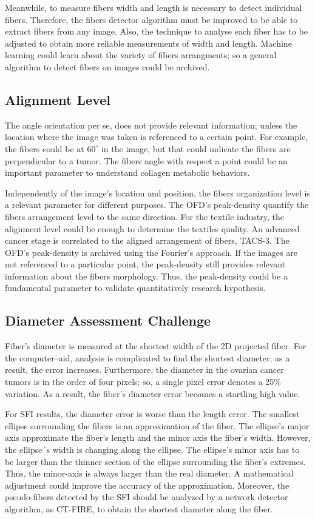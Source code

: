 \documentclass[12pt,a4paper]{article}
\begin{document}
Meanwhile, to measure fibers width and length is necessary to detect individual fibers. Therefore, the fibers detector algorithm must be improved to be able to extract fibers from any image. Also, the technique to analyse each fiber has to be adjusted to obtain more reliable measurements of width and length. Machine learning could learn about the variety of fibers arrangments; so a general algorithm to detect fibers on images could be archived.

\subsection{Alignment Level}
The angle orientation per se, does not provide relevant information; unless the location where the image was taken is referenced to a certain point. For example, the fibers could be at $60^{\circ}$ in the image, but that could indicate the fibers are perpendicular to a tumor. The fibers angle with respect a point could be an important parameter to understand collagen metabolic behaviors.

Independently of the image’s location and position, the fibers organization level is a relevant parameter for different purposes. The OFD's peak-density quantify the fibers arrangement level to the same direction. For the textile industry, the alignment level could be enough to determine the textiles quality. An advanced cancer stage is correlated to the aligned arrangement of fibers, TACS-3. The OFD’s peak-density is archived using the Fourier’s approach. If the images are not referenced to a particular point, the peak-density still provides relevant information about the fibers morphology. Thus, the peak-density could be a fundamental parameter to validate quantitatively research hypothesis.

\subsection{Diameter Assessment Challenge}
Fiber's diameter is measured at the shortest width of the 2D projected fiber.  For the computer–aid, analysis is complicated to find the shortest diameter; as a result, the error increases. Furthermore, the diameter in the ovarian cancer tumors is in the order of four pixels; so, a single pixel error denotes a 25\% variation. As a result, the fiber’s diameter error becomes a startling high value.  

For SFI results, the diameter error is worse than the length error. The smallest ellipse surrounding the fibers is an approximation of the fiber. The ellipse's major axis approximate the fiber's length and the minor axis the fiber's width. However, the ellipse´s width is changing along the ellipse. The ellipse’s minor axis has to be larger than the thinner section of the ellipse surrounding the fiber's extremes. Thus, the minor-axis is always larger than the real diameter. A mathematical adjustment could improve the accuracy of the approximation. Moreover, the pseudo-fibers detected by the SFI should be analyzed by a network detector algorithm, as CT-FIRE, to obtain the shortest diameter along the fiber.
\end{document}
